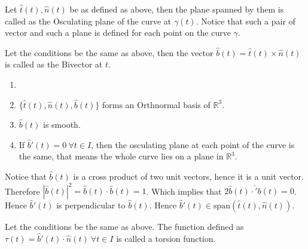 \vspace{0.4cm}
\begin{definition}
    Let $\hat{t}(t), \hat{n}(t)$ be as defined as above, then the plane spanned by them is called as the Osculating plane of the curve at $\gamma(t)$. Notice that such a pair of vector and such a plane is defined for each point on the curve $\gamma$.
\end{definition}
\vspace{0.4cm}
\begin{definition}[Bivector]
    Let the conditions be the same as above, then the vector $\hat{b}(t)=\hat{t}(t)\times\hat{n}(t)$ is called as the Bivector at $t$.
\end{definition}
\vspace{0.4cm}
\begin{remark}
    \begin{enumerate}[label=\roman*.]
        \item [] 
        \item $\{\hat{t}(t),\hat{n}(t),\hat{b}(t)\}$ forms an Orthnormal basis of $\mathbb{R}^{3}$.
        \item $\hat{b}(t)$ is smooth.
        \item If $\hat{b}'(t)=0~\forall t\in I$, then the osculating plane at each point of the curve is the same, that means the whole curve lies on a plane in $\mathbb{R}^{3}$.
    \end{enumerate}
\end{remark}
\vspace{0.4cm}
\begin{note}
    Notice that $\hat{b}(t)$ is a cross product of two unit vectors, hence it is a unit vector.\\ 
    Therefore $|\hat{b}(t)|^{2}=\hat{b}(t)\cdot\hat{b}(t)=1$. Which implies that $2\hat{b}(t)\cdot\hat'{b}(t)=0$. Hence $\hat{b}'(t)$ is perpendicular to $\hat{b}(t)$.
    Hence $\hat{b}'(t)\in\text{span}\left(\hat{t}(t),\hat{n}(t)\right)$.
\end{note}
\vspace{0.4cm}
\begin{definition}
    Let the conditions be the same as above. The function defined as $\tau(t)=\hat{b}'(t)\cdot\hat{n}(t)~\forall t\in I$ is called a torsion function.
\end{definition}
\vspace{0.4cm}

